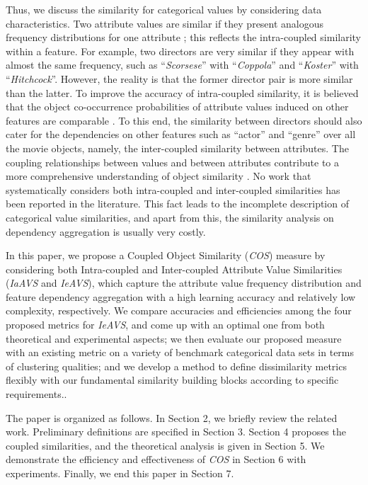 \documentclass{article}
\numberwithin{equation}{section}
\begin{document}
Thus, we discuss the similarity for categorical values by considering data characteristics. Two attribute values are similar if they present analogous frequency distributions for one attribute \cite{Boriah:2008}; this reflects the intra-coupled similarity within a feature. For example, two directors are very similar if they appear with almost the same frequency, such as ``\emph{Scorsese}'' with ``\emph{Coppola}'' and  ``\emph{Koster}'' with ``\emph{Hitchcock}''. However, the reality is that the former director pair is more similar than the latter. To improve the accuracy of intra-coupled similarity, it is believed that the object co-occurrence probabilities of attribute values induced on other features are comparable \cite{Ahmad2:2007}. To this end, the similarity between directors should also cater for the dependencies on other features such as ``actor'' and ``genre'' over all the movie objects, namely, the inter-coupled similarity between attributes. The coupling relationships between values and between attributes contribute to a more comprehensive understanding of object similarity \cite{Cao:2011}. No work that systematically considers both intra-coupled and inter-coupled similarities has been reported in the literature. This fact leads to the incomplete description of categorical value similarities, and apart from this, the similarity analysis on dependency aggregation is usually very costly.

In this paper, we propose a Coupled Object Similarity (\emph{COS}) measure by considering both Intra-coupled and Inter-coupled Attribute Value Similarities (\emph{IaAVS} and \emph{IeAVS}), which capture the attribute value frequency distribution and feature dependency aggregation with a high learning accuracy and relatively low complexity, respectively. We compare accuracies and efficiencies among the four proposed metrics for \emph{IeAVS}, and come up with an optimal one from both theoretical and experimental aspects; we then evaluate our proposed measure with an existing metric on a variety of benchmark categorical data sets in terms of clustering qualities; and we develop a method to define dissimilarity metrics flexibly with our fundamental similarity building blocks according to specific requirements..

The paper is organized as follows. In Section 2, we briefly review the related work. Preliminary definitions are specified in Section 3. Section 4 proposes the coupled similarities, and the theoretical analysis is given in Section 5. We demonstrate the efficiency and effectiveness of \emph{COS} in Section 6 with experiments. Finally, we end this paper in Section 7.
\end{document}
